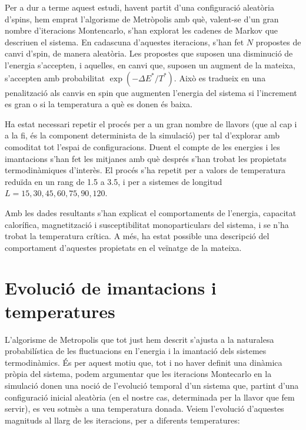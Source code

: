 \documentclass[a4paper]{article}
\begin{document}
Per a dur a terme aquest estudi, havent partit d'una configuració aleatòria d'spins, hem emprat l'algorisme de Metròpolis amb què, valent-se d'un gran nombre d'iteracions Montencarlo, s'han explorat les cadenes de Markov que descriuen el sistema. En cadascuna d'aquestes iteracions, s'han fet $N$ propostes de canvi d'spin, de manera aleatòria. Les propostes que suposen una disminució de l'energia s'accepten, i aquelles, en canvi que, suposen un augment de la mateixa, s'accepten amb probabilitat $\exp\left(-\Delta E^*/T^*\right)$. Això es tradueix en una penalització als canvis en spin que augmenten l'energia del sistema si l'increment es gran o si la temperatura a què es donen és baixa.

Ha estat necessari repetir el procés per a un gran nombre de llavors (que al cap i a la fi, és la component determinista de la simulació) per tal d'explorar amb comoditat tot l'espai de configuracions. Duent el compte de les energies i les imantacions s'han fet les mitjanes amb què després s'han trobat les propietats termodinàmiques d'interès. El procés s'ha repetit per a valors de temperatura reduïda en un rang de 1.5 a 3.5, i per a sistemes de longitud $L=15,30,45,60,75,90,120$.

Amb les dades resultants s'han explicat el comportaments de l'energia, capacitat calorífica, magnetització i susceptibilitat monoparticulars del sistema, i se n'ha trobat la temperatura crítica. A més, ha estat possible una descripció del comportament d'aquestes propietats en el veïnatge de la mateixa.

\section{Evolució de imantacions i temperatures}

L'algorisme de Metropolis que tot just hem descrit s'ajusta a la naturalesa probabilística de les fluctuacions en l'energia i la imantació dels sistemes termodinàmics. És per aquest motiu que, tot i no haver definit una dinàmica pròpia del sistema, podem argumentar que les iteracions Montecarlo en la simulació donen una noció de l'evolució temporal d'un sistema que, partint d'una configuració inicial aleatòria (en el nostre cas, determinada per la llavor que fem servir), es veu sotmès a una temperatura donada. Veiem l'evolució d'aquestes magnituds al llarg de les iteracions, per a diferents temperatures:
\end{document}
